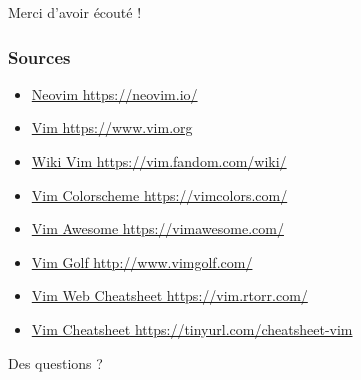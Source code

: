 \documentclass[10pt]{beamer}
\begin{document}
\begin{appendix}

	\begin{frame}[standout]
		Merci d'avoir écouté !
	\end{frame}

	\begin{frame}
		\frametitle{Sources}

		\begin{itemize}
			\item \href{https://neovim.io/}{Neovim https://neovim.io/}
			\item \href{https://www.vim.org}{Vim https://www.vim.org}
			\item \href{https://vim.fandom.com/wiki/}{Wiki Vim https://vim.fandom.com/wiki/}
		\end{itemize}

		\begin{itemize}
			\item \href{https://vimcolors.com/}{Vim Colorscheme https://vimcolors.com/}
			\item \href{https://vimawesome.com/}{Vim Awesome https://vimawesome.com/}
			\item \href{http://www.vimgolf.com/}{Vim Golf http://www.vimgolf.com/}
		\end{itemize}

		\begin{itemize}
			\item \href{https://vim.rtorr.com/}{Vim Web Cheatsheet https://vim.rtorr.com/}
			\item \href{https://tinyurl.com/cheatsheet-vim}{Vim Cheatsheet https://tinyurl.com/cheatsheet-vim}
		\end{itemize}
	\end{frame}

	\begin{frame}[standout]
		Des questions ?
	\end{frame}

\end{appendix}
\end{document}
